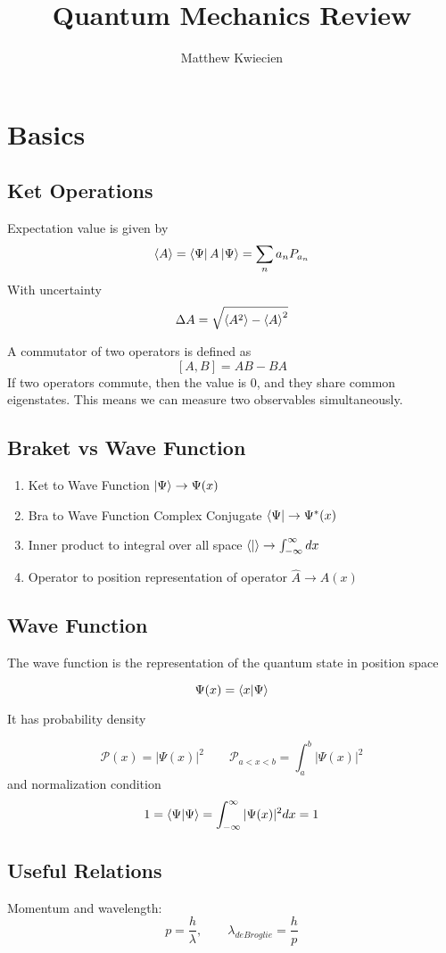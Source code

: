 \documentclass{article}
\title{Quantum Mechanics Review}
\author{Matthew Kwiecien}
\begin{document}
\maketitle
\section{Basics}
\subsection{Ket Operations}
Expectation value is given by
$$
  \braket{A} = \bra{\Psi} A \ket{\Psi} = \sum_n a_n  P_{a_n}
$$
With uncertainty
$$
  \Delta A = \sqrt{\braket{A^2} - \braket{A}^2 }
$$

A commutator of two operators is defined as
$$
  [A,B] = AB - BA
$$
If two operators commute, then the value is 0, and they share common eigenstates.  This means we can measure two observables simultaneously.

\subsection{Braket vs Wave Function}
\begin{enumerate}
  \item Ket to Wave Function $\ket{\Psi} \to \Psi(x)$
  \item Bra to Wave Function Complex Conjugate $\bra{\Psi} \to \Psi^*(x)$
  \item Inner product to integral over all space $\braket{|} \to \int_{-\infty}^{\infty} dx$
  \item Operator to position representation of operator $\hat{A} \to A(x)$
\end{enumerate}

\subsection{Wave Function}
The wave function is the representation of the quantum state in position space

$$
  \Psi(x) = \braket{x | \Psi}
$$

It has probability density

$$
  \mathcal{P}(x) = |\Psi(x)|^2 \qquad \mathcal{P}_{a<x<b} = \int_{a}^{b}|\Psi(x)|^2
$$
and normalization condition
$$
  1 = \braket{\Psi | \Psi} = \int_{-\infty}^{\infty} |\Psi(x)|^2 dx = 1
$$

\subsection{Useful Relations}
Momentum and wavelength:
$$ p = \frac{h}{\lambda}, \qquad \lambda_{de Broglie} = \frac{h}{p} $$
\end{document}
